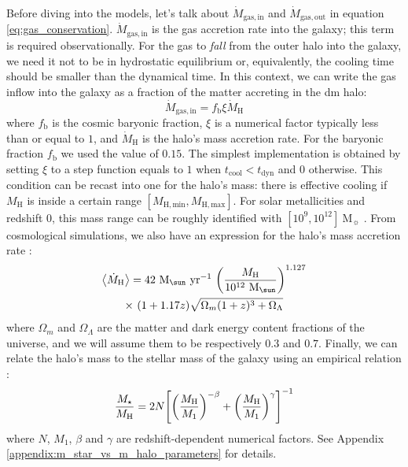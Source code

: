 \documentclass[fleqn, usenatbib]{mnras}
\begin{document}
Before diving into the models, let's talk about \(\dot{M}_{\mathrm{gas, in}}\) and \(\dot{M}_{\mathrm{gas, out}}\) in equation \ref{eq:gas_conservation}. \(\dot{M}_{\mathrm{gas, in}}\) is the gas accretion rate into the galaxy; this term is required observationally. For the gas to \textit{fall} from the outer halo into the galaxy, we need it not to be in hydrostatic equilibrium or, equivalently, the cooling time should be smaller than the dynamical time. In this context, we can write the gas inflow into the galaxy as a fraction of the matter accreting in the \acrshort{dm} halo:
\begin{equation} \label{eq:gas_in}
	\dot{M}_{\mathrm{gas, in}} = f_{\mathrm{b}} \xi \dot{M}_{\mathrm{H}}
\end{equation}
where \(f_{\mathrm{b}}\) is the cosmic baryonic fraction, \(\xi\) is a numerical factor typically less than or equal to \(1\), and \(\dot{M}_{\mathrm{H}}\) is the halo's mass accretion rate. For the baryonic fraction \(f_{\mathrm{b}}\) we used the value of \(0.15\). The simplest implementation is obtained by setting \(\xi\) to a step function equals to \(1\) when \(t_{\mathrm{cool}} < t_{\mathrm{dyn}}\) and \(0\) otherwise. This condition can be recast into one for the halo's mass: there is effective cooling if \(M_{\mathrm{H}}\) is inside a certain range \([M_{\mathrm{H, min}}, M_{\mathrm{H, max}}]\). For solar metallicities and redshift \(0\), this mass range can be roughly identified with \([10^9, 10^{12}]\ \mathrm{M_{\sun}}\) \citep{Mo2010}. From cosmological simulations, we also have an expression for the halo's mass accretion rate \citep{McBride2009}:
\begin{multline} \label{eq:halo_accretion}
	\expval{\dot{M}_{\mathrm{H}}} = 42\ \mathrm{M_{\sun}\ yr^{-1}}\ \qty(\frac{M_{\mathrm{H}}}{10^{12}\ \mathrm{M_{\sun}}})^{1.127}\\
	\times\ (1 + 1.17 z) \sqrt{\Omega_m (1 + z)^3 + \Omega_\Lambda}
\end{multline}
where \(\Omega_m\) and \(\Omega_\Lambda\) are the matter and dark energy content fractions of the universe, and we will assume them to be respectively \(0.3\) and \(0.7\). Finally, we can relate the halo's mass to the stellar mass of the galaxy using an empirical relation \citep{Moster2012}:
\begin{equation} \label{eq:m_star_vs_m_halo}
	\frac{M_{\star}}{M_{\mathrm{H}}} = 2 N \qty[\qty(\frac{M_{\mathrm{H}}}{M_1})^{-\beta} + \qty(\frac{M_{\mathrm{H}}}{M_1})^\gamma]^{-1}
\end{equation}
where \(N\), \(M_1\), \(\beta\) and \(\gamma\) are redshift-dependent numerical factors. See Appendix \ref{appendix:m_star_vs_m_halo_parameters} for details.
\end{document}
